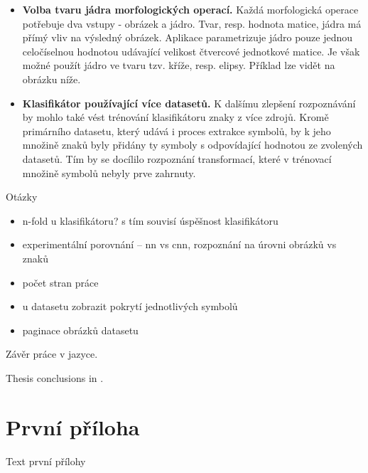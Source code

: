 \documentclass[
  master=true,
  biblatex,
  glossaries,
  index
]{kidiplom}
\begin{document}
\begin{itemize}
\item \textbf{Volba tvaru jádra morfologických operací.} Každá morfologická operace potřebuje dva vstupy - obrázek a jádro. Tvar, resp. hodnota matice, jádra má přímý vliv na výsledný obrázek. Aplikace parametrizuje jádro pouze jednou celočíselnou hodnotou udávající velikost čtvercové jednotkové matice. Je však možné použít jádro ve tvaru tzv. kříže, resp. elipsy. Příklad lze vidět na obrázku níže.
\item \textbf{Klasifikátor používající více datasetů.} K dalšímu zlepšení rozpoznávání by mohlo také vést trénování klasifikátoru znaky z více zdrojů. Kromě primárního datasetu, který udává i proces extrakce symbolů, by k jeho množině znaků byly přidány ty symboly s odpovídající hodnotou ze zvolených datasetů. Tím by se docílilo rozpoznání transformací, které v trénovací množině symbolů nebyly prve zahrnuty.
\end{itemize}


Otázky\\
\begin{itemize}
\item n-fold u klasifikátoru? s tím souvisí úspěšnost klasifikátoru
\item experimentální porovnání -- nn vs cnn, rozpoznání na úrovni obrázků vs znaků
\item počet stran práce
\item u datasetu zobrazit pokrytí jednotlivých symbolů
\item paginace obrázků datasetu

\end{itemize}

\begin{kiconclusions}
Závěr práce v  jazyce.
\end{kiconclusions}

\begin{kiconclusions}[english]
Thesis conclusions in .
\end{kiconclusions}

\appendix

\section{První příloha}
Text první přílohy
\end{document}

